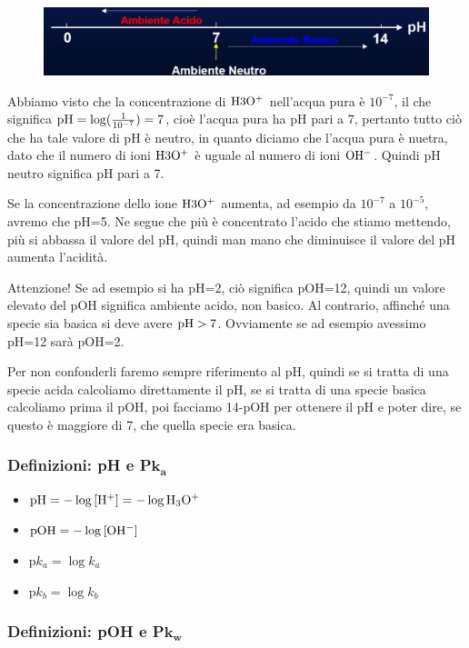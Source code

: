 \begin{figure}[H]
    \centering
    \includegraphics[width=12cm]{immagini/scala_pH.png}
\end{figure}

Abbiamo visto che la concentrazione di $\rm H3O^+$ nell'acqua pura è $10^{-7}$, il che significa $\rm pH=\log(\frac{1}{10^{-7}})=7$, cioè l'acqua pura ha pH pari a 7, pertanto tutto ciò che ha tale valore di pH è neutro, in quanto diciamo che l'acqua pura è nuetra, dato che il numero di ioni $\rm H3O^+$ è uguale al numero di ioni $\rm OH^-$. Quindi pH neutro significa pH pari a 7.

Se la concentrazione dello ione $\rm H3O^+$ aumenta, ad esempio da $10^{-7}$ a $10^{-5}$, avremo che pH=5. Ne segue che più è concentrato l'acido che stiamo mettendo, più si abbassa il valore del pH, quindi man mano che diminuisce il valore del pH aumenta l'acidità.

Attenzione! Se ad esempio si ha pH=2, ciò significa pOH=12, quindi un valore elevato del pOH significa ambiente acido, non basico. Al contrario, affinché una specie sia basica si deve avere $\rm pH > 7$. Ovviamente se ad esempio avessimo pH=12 sarà pOH=2.

Per non confonderli faremo sempre riferimento al pH, quindi se si tratta di una specie acida calcoliamo direttamente il pH, se si tratta di una specie basica calcoliamo prima il pOH, poi facciamo 14-pOH per ottenere il pH e poter dire, se questo è maggiore di 7, che quella specie era basica.

\subsubsection{Definizioni: pH e P$\boldsymbol{k_a}$}

\begin{itemize}
    \item $\rm pH=-\log{[H^+]}=-\log{H_3O^+}$
    \item $\rm pOH=-\log{[OH^-]}$
    \item $\text{p}k_a=\log{k_a}$
    \item $\text{p}k_b=\log{k_b}$
\end{itemize}

\subsubsection{Definizioni: pOH e P$\boldsymbol{k_w}$}

